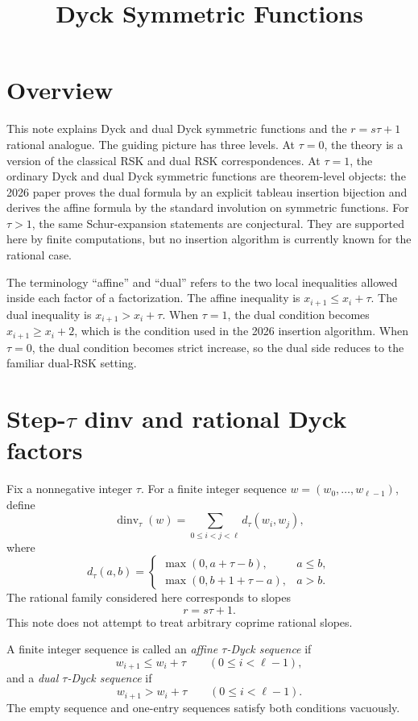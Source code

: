 \documentclass{article}
\title{Dyck Symmetric Functions}
\author{}
\date{}
\DeclareMathOperator{\dinv}{dinv}
\begin{document}
\maketitle

\section{Overview}

This note explains Dyck and dual Dyck symmetric functions and the
\(r=s\tau+1\) rational analogue.  The guiding picture has three levels.
At \(\tau=0\), the theory is a version of the classical RSK and dual RSK
correspondences.  At \(\tau=1\), the ordinary Dyck and dual Dyck symmetric
functions are theorem-level objects: the 2026 paper proves the dual formula by
an explicit tableau insertion bijection and derives the affine formula by the
standard involution on symmetric functions.  For \(\tau>1\), the same
Schur-expansion statements are conjectural.  They are supported here by finite
computations, but no insertion algorithm is currently known for the rational
case.

The terminology ``affine'' and ``dual'' refers to the two local inequalities
allowed inside each factor of a factorization.  The affine inequality is
\(x_{i+1}\le x_i+\tau\).  The dual inequality is
\(x_{i+1}>x_i+\tau\).  When \(\tau=1\), the dual condition becomes
\(x_{i+1}\ge x_i+2\), which is the condition used in the 2026 insertion
algorithm.  When \(\tau=0\), the dual condition becomes strict increase, so
the dual side reduces to the familiar dual-RSK setting.

\section{Step-$\tau$ dinv and rational Dyck factors}

Fix a nonnegative integer \(\tau\).  For a finite integer sequence
\(w=(w_0,\ldots,w_{\ell-1})\), define
\[
  \dinv_\tau(w)=\sum_{0\le i<j<\ell} d_\tau(w_i,w_j),
\]
where
\[
  d_\tau(a,b)=
  \begin{cases}
    \max(0,a+\tau-b),& a\le b,\\
    \max(0,b+1+\tau-a),& a>b.
  \end{cases}
\]
The rational family considered here corresponds to slopes
\[
  r=s\tau+1.
\]
This note does not attempt to treat arbitrary coprime rational slopes.

A finite integer sequence is called an \emph{affine \(\tau\)-Dyck sequence} if
\[
  w_{i+1}\le w_i+\tau
  \qquad(0\le i<\ell-1),
\]
and a \emph{dual \(\tau\)-Dyck sequence} if
\[
  w_{i+1}>w_i+\tau
  \qquad(0\le i<\ell-1).
\]
The empty sequence and one-entry sequences satisfy both conditions vacuously.
\end{document}
